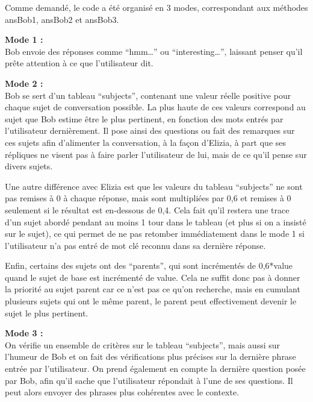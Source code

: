 \documentclass[paper=a4, 12pt]{report}
\begin{document}
\vspace{0.5cm}

Comme demandé, le code a été organisé en 3 modes, correspondant aux méthodes ansBob1, ansBob2 et ansBob3.

\vspace{0.5cm}

\textbf{Mode 1 :} \\
Bob  envoie des réponses comme “hmm…” ou “interesting…”, laissant penser qu’il prête attention à ce que l’utilisateur dit.

\vspace{0.5cm}

\textbf{Mode 2 :} \\
Bob se sert d’un tableau “subjects”, contenant une valeur réelle positive pour chaque sujet de conversation possible. La plus haute de ces valeurs correspond au sujet que Bob estime être le plus pertinent, en fonction des mots entrés par l’utilisateur dernièrement. Il pose ainsi des questions ou fait des remarques sur ces sujets afin d’alimenter la conversation, à la façon d’Elizia, à part que ses répliques ne visent pas à faire parler l’utilisateur de lui, mais de ce qu’il pense sur divers sujets.

\vspace{0.5cm}

Une autre différence avec Elizia est que les valeurs du tableau “subjects” ne sont pas remises à 0 à chaque réponse, mais sont multipliées par 0,6 et remises à 0 seulement si le résultat est en-dessous de 0,4. Cela fait qu’il restera une trace d’un sujet abordé pendant au moins 1 tour dans le tableau (et plus si on a insisté sur le sujet), ce qui permet de ne pas retomber immédiatement dans le mode 1 si l’utilisateur n’a pas entré de mot clé reconnu dans sa dernière réponse.

\vspace{0.5cm}

Enfin, certains des sujets ont des “parents”, qui sont incrémentés de 0,6*value quand le sujet de base est incrémenté de value. Cela ne suffit donc pas à donner la priorité au sujet parent car ce n’est pas ce qu’on recherche, mais en cumulant plusieurs sujets qui ont le même parent, le parent peut effectivement devenir le sujet le plus pertinent.

\vspace{0.5cm}

\textbf{Mode 3 :} \\
On vérifie un ensemble de critères sur le tableau “subjects”, mais aussi sur l’humeur de Bob et on fait des vérifications plus précises sur la dernière phrase entrée par l’utilisateur. On prend également en compte la dernière question posée par Bob, afin qu’il sache que l’utilisateur répondait à l’une de ses questions. Il peut alors envoyer des phrases plus cohérentes avec le contexte.
\end{document}
